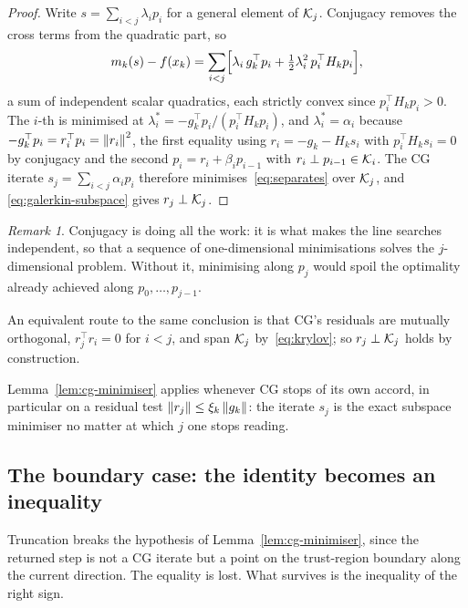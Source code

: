 \documentclass[11pt]{article}
\theoremstyle{plain}
\theoremstyle{definition}
\theoremstyle{remark}
\newtheorem{remark}[theorem]{Remark}
\numberwithin{equation}{section}
\begin{document}
\begin{proof}
    Write $s = \sum_{i<j}\lambda_i p_i$ for a general element of ${\mathcal{K}}_j$. Conjugacy removes the
    cross terms from the quadratic part, so
    \begin{equation}
        m_k(s) - f(x_k)
          = \sum_{i<j}\Bigl[ \lambda_i\, g_k^\top p_i
                             + \tfrac12 \lambda_i^2\, p_i^\top H_k p_i \Bigr] ,
        \label{eq:separates}
    \end{equation}
    a sum of independent scalar quadratics, each strictly convex since
    $p_i^\top H_k p_i > 0$. The $i$-th is minimised at
    $\lambda_i^* = -g_k^\top p_i / (p_i^\top H_k p_i)$, and $\lambda_i^* = \alpha_i$ because
    $-g_k^\top p_i = r_i^\top p_i = \left \lVert r_i \right \rVert^2$, the first equality using
    $r_i = -g_k - H_k s_i$ with $p_i^\top H_k s_i = 0$ by conjugacy and the second
    $p_i = r_i + \beta_i p_{i-1}$ with $r_i \perp p_{i-1} \in {\mathcal{K}}_i$. The CG iterate
    $s_j = \sum_{i<j}\alpha_i p_i$ therefore minimises~\eqref{eq:separates} over ${\mathcal{K}}_j$, and
    \eqref{eq:galerkin-subspace} gives $r_j \perp {\mathcal{K}}_j$.
\end{proof}

\begin{remark}
    Conjugacy is doing all the work: it is what makes the line searches independent, so that a
    sequence of one-dimensional minimisations solves the $j$-dimensional problem. Without it,
    minimising along $p_j$ would spoil the optimality already achieved along $p_0,\dots,p_{j-1}$.

    An equivalent route to the same conclusion is that CG's residuals are mutually orthogonal,
    $r_j^\top r_i = 0$ for $i < j$, and span ${\mathcal{K}}_j$ by~\eqref{eq:krylov}; so $r_j \perp {\mathcal{K}}_j$
    holds by construction.
\end{remark}

Lemma~\ref{lem:cg-minimiser} applies whenever CG stops of its own accord, in particular on a
residual test $\left \lVert r_j \right \rVert \leq \xi_k\left \lVert g_k \right \rVert$: the iterate $s_j$ is the exact subspace minimiser
no matter at which $j$ one stops reading.

\subsection{The boundary case: the identity becomes an inequality}

Truncation breaks the hypothesis of Lemma~\ref{lem:cg-minimiser}, since the returned step is not a
CG iterate but a point on the trust-region boundary along the current direction. The equality is
lost. What survives is the inequality of the right sign.
\end{document}
